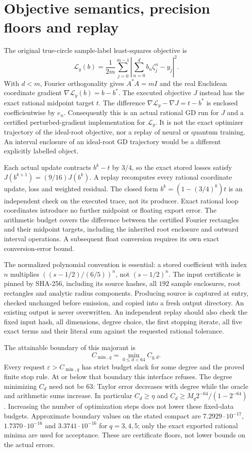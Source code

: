 \documentclass[11pt,oneside,openany]{book}
\theoremstyle{definition}\newtheorem{definition}[theorem]{Definition}
\theoremstyle{remark}\newtheorem{remark}[theorem]{Remark}
\begin{document}
\section{Objective semantics, precision floors and replay}\label{ar:semantics}
The original true-circle sample-label least-squares objective is
\[
 \mathcal L_y(b)=\frac1{2m}\sum_{j=0}^{m-1}
 \left|\sum_{n=0}^d b_n\zeta_j^n-y_j\right|^2.
\]
With $d<m$, Fourier orthogonality gives $A^*A=mI$ and the real Euclidean
coordinate gradient $\nabla\mathcal L_y(b)=b-b^*$. The executed objective
$J$ instead has the exact rational midpoint target $t$.
The difference $\nabla\mathcal L_y-\nabla J=t-b^*$ is enclosed
coefficientwise by $e_n$.
Consequently this is an actual rational GD run for $J$ and a certified
perturbed-gradient implementation for $\mathcal L_y$. It is not the exact
optimizer trajectory of the ideal-root objective, nor a replay of neural or
quantum training. An interval enclosure of an ideal-root GD trajectory
would be a different explicitly labelled object.

Each actual update contracts $b^k-t$ by $3/4$, so the exact stored losses
satisfy $J(b^{k+1})=(9/16)J(b^k)$. A replay recomputes every rational
coordinate update, loss and weighted residual. The closed form
$b^k=(1-(3/4)^k)t$ is an independent check on the executed trace, not its
producer. Exact rational loop coordinates introduce no further midpoint or
floating export error. The arithmetic budget covers the difference between
the certified Fourier rectangles and their midpoint targets, including the
inherited root enclosure and outward interval operations. A subsequent
float conversion requires its own exact conversion-error bound.

The normalized polynomial convention is essential: a stored coefficient
with index $n$ multiplies $((s-1/2)/(6/5))^n$, not $(s-1/2)^n$.
The input certificate is pinned by SHA-256, including its source hashes,
all $192$ sample enclosures, root rectangles and analytic radius components.
Producing source is captured at entry, checked unchanged before emission,
and copied into a fresh output directory. An existing output is never
overwritten. An independent replay should also check the fixed input hash,
all dimensions, degree choice, the first stopping iterate, all five exact
terms and their literal sum against the requested rational tolerance.

The attainable boundary of this majorant is
\[
 C_{\min,q}=\min_{0\le d<64}C_{q,d}.
\]
Every request $\varepsilon>C_{\min,q}$ has strict budget slack for some
degree and the proved finite stop rule. At or below that boundary this
interface refuses. The degree minimizing $C_d$ need not be $63$:
Taylor error decreases with degree while the oracle and arithmetic sums
increase. In particular $C_d\ge\eta$ and
$C_d\ge M_q2^{-64}/(1-2^{-64})$. Increasing the number of optimization
steps does not lower these fixed-data budgets. Approximate boundary values
on the stated compact are $7.2929\cdot10^{-17}$,
$1.7370\cdot10^{-16}$ and $3.3741\cdot10^{-16}$ for $q=3,4,5$;
only the exact exported rational minima are used for acceptance.
These are certificate floors, not lower bounds on the actual errors.
\end{document}
